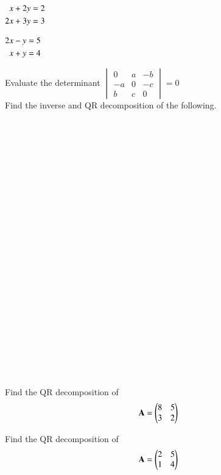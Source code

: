\item 
$\begin{alignedat}[t]{2}
x+2y&=2 
\\
2x+3y&=3 
\end{alignedat}$
\item $\begin{alignedat}[t]{2}
2x-y&=5 
\\
x+y&=4 
\end{alignedat}$
\item Evaluate the determinant
$\begin{vmatrix}0&a&-b\\-a&0&-c\\b&c&0\end{vmatrix}=0$
\\
Find the inverse and QR decomposition of the following.
  \item {}\\
  \item{}\\
  \item{}\\
  \item{}\\
  \item {}\\
  \item {}\\
  \item {}\\
  \item {}\\
  \item {}\\
  \item {}\\
  \item {}\\
  \item {}\\
  \item {}\\
\item Find the QR decomposition of 
\begin{align}
\mathbf{A}=\begin{pmatrix}8&5\\3&2\end{pmatrix} \label{eq:solutions/decomp/2/29/eq:1}
\end{align}
%
\item Find the QR decomposition of 
\begin{align}
\mathbf{A}=\begin{pmatrix}2&5\\1&4\end{pmatrix} \label{eq:solutions/decomp/2/30/1}
\end{align}

%        


